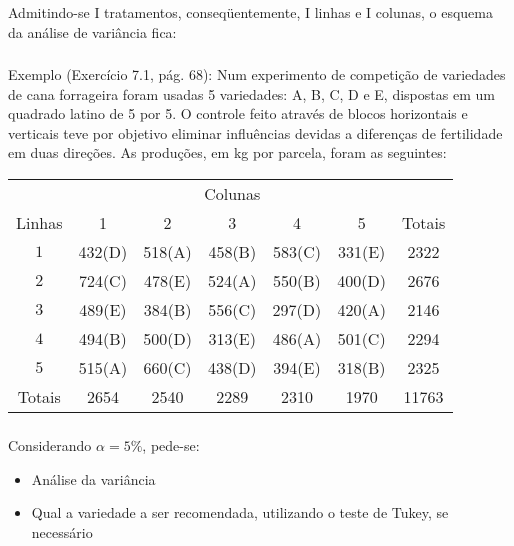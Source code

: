 \documentclass[14pt,aspectratio=1610]{beamer}
\begin{document}
\begin{frame}{}
\frametitle{}
\begin{block}{}
\justifying
Admitindo-se I tratamentos, conseqüentemente, I linhas e I colunas, o esquema da
análise de variância fica:
\begin{table}[!h]
\end{table}
\end{block}
\end{frame}

\begin{frame}{}
\frametitle{}
\begin{block}{Exemplo (Exercício 7.1, pág. 68):}
\justifying
Num experimento de competição de variedades de cana forrageira foram usadas 5 variedades: A, B, C, D e E, dispostas em um 
quadrado latino de 5 por 5. O controle feito através de blocos horizontais e verticais teve por objetivo eliminar influências devidas a diferenças de fertilidade em duas direções. As produções, em kg por parcela, foram as seguintes:
\begin{table}[!h]
\begin{tabular}{ccccccc}
\hline
&\multicolumn{5}{c}{Colunas}\\
\cline{2-6}
Linhas&1&2&3&4&5&Totais\\
\hline
$1$&432(D)&518(A)&458(B)&583(C)&331(E)&2322\\
$2$&724(C)&478(E)&524(A)&550(B)&400(D)&2676\\
$3$&489(E)&384(B)&556(C)&297(D)&420(A)&2146\\
$4$&494(B)&500(D)&313(E)&486(A)&501(C)&2294\\
$5$&515(A)&660(C)&438(D)&394(E)&318(B)&2325\\
\hline
Totais&2654&2540&2289&2310&1970&11763\\
\hline
\end{tabular}
\end{table}
\end{block}
\end{frame}

\begin{frame}{}
\frametitle{}
\begin{block}{}
\justifying
Considerando $\alpha = 5\%$, pede-se:
\begin{itemize}
  \item Análise da variância
  \item Qual a variedade a ser recomendada, utilizando o teste de Tukey, se necessário
\end{itemize}
\end{block}
\end{frame}
\end{document}
